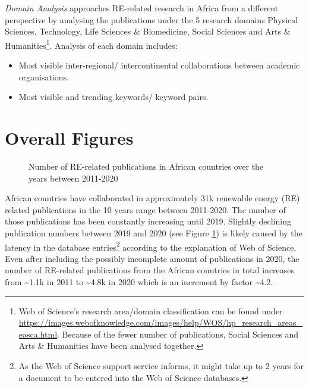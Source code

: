 \documentclass[12pt,twoside]{report}
\providecommand{\tightlist}{%
  \setlength{\itemsep}{0pt}\setlength{\parskip}{0pt}}
\let\rmarkdownfootnote\footnote%
\def\footnote{\protect\rmarkdownfootnote}
\begin{document}
\emph{Domain Analysis} approaches RE-related research in Africa from a different perspective
by analysing the publications under the 5 research domains Physical Sciences,
Technology, Life Sciences \& Biomedicine, Social Sciences and Arts \& Humanities\footnote{Web of Science's research area/domain classification can be found under \url{https://images.webofknowledge.com/images/help/WOS/hp_research_areas_easca.html}. Because of the fewer number of publications, Social Sciences and Arts \& Humanities have been analysed together.}. Analysis
of each domain includes:

\begin{itemize}
\tightlist
\item
  Most visible inter-regional/ intercontinental collaborations between academic organisations.
\item
  Most visible and trending keywords/ keyword pairs.
\end{itemize}

\hypertarget{overall-figures}{%
\section{Overall Figures}\label{overall-figures}}

\begin{figure}
 \begin{subfigure}[b]{0.5\textwidth}

\end{subfigure}
\caption{Number of RE-related publications in African countries over the years between 2011-2020}\label{fig:puboty}
\end{figure}

African countries have collaborated in approximately 31k renewable energy (RE) related publications in the 10 years range between 2011-2020. The number of those publications has been constantly
increasing until 2019. Slightly declining publication numbers between 2019
and 2020 (see Figure \ref{fig:puboty})
is likely caused by the latency in the database entries\footnote{As the Web of Science support service informs, it might take up to 2 years for a document to be entered into the Web of Science databases.} according to the explanation of Web of Science. Even after including the
possibly incomplete amount of publications in 2020, the number of RE-related publications from
the African countries in total increases from \textasciitilde1.1k in 2011 to \textasciitilde4.8k in
2020 which is an increment by factor \textasciitilde4.2.
\end{document}
